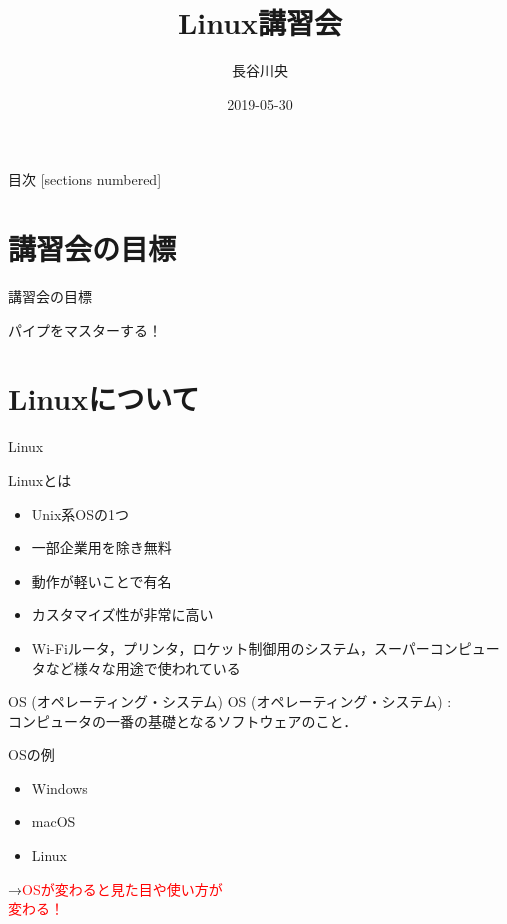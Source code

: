 \documentclass[uplatex, dvipdfmx, 12pt]{beamer}
\title{\bfseries Linux講習会}
\author{長谷川央}
\institute{三重大学 工学部\\情報工学科}
\date{2019-05-30}
\begin{document}
{
  \maketitle
}
\begin{frame}{目次}
  [sections numbered]
  \tableofcontents
\end{frame}

\section{講習会の目標}
\begin{frame}{講習会の目標}
  \begin{LARGE}パイプをマスターする！\end{LARGE}
\end{frame}

\section{Linuxについて}
\begin{frame}{Linux}
  \begin{block}{Linuxとは}
  \begin{itemize}
    \setlength\itemsep{1em}
    \item Unix系OSの1つ
    \item 一部企業用を除き無料
    \item 動作が軽いことで有名
    \item カスタマイズ性が非常に高い
    \item Wi-Fiルータ，プリンタ，ロケット制御用のシステム，スーパーコンピュータなど様々な用途で使われている
  \end{itemize}
\end{block}
\end{frame}
\begin{frame}{OS (オペレーティング・システム) }
  OS (オペレーティング・システム) : \\コンピュータの一番の基礎となるソフトウェアのこと． 
  
  \vspace{1em} 
  \begin{block}{OSの例}
  \begin{itemize}
    \setlength\itemsep{1em}
    \item Windows
    \item macOS
    \item Linux
  \end{itemize}
  \end{block}

  \pause
  \vspace{1em}
  \begin{Large}→\textcolor{red}{OSが変わると見た目や使い方が\\\hspace{1em}変わる！}\end{Large}
\end{frame}
\end{document}

